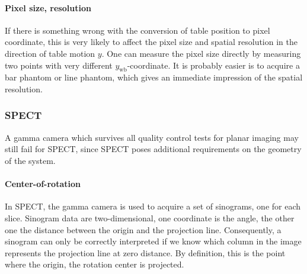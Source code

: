 \documentclass[11pt,oneside]{article}
\begin{document}
\paragraph{Pixel size, resolution}
If there is something wrong with the conversion of table position to pixel
coordinate, this is very likely to affect the pixel size and spatial
resolution in the direction of table motion $y$. One can measure the pixel
size directly by measuring two points with very different
$y_{\mbox{wb}}$-coordinate. It is probably easier is to acquire a bar phantom
or line phantom, which gives an immediate impression of the spatial
resolution.


\subsubsection{SPECT}
A gamma camera which survives all quality control tests for planar
imaging may still fail for SPECT, since SPECT poses additional
requirements on the geometry of the system.

\paragraph{Center-of-rotation}
In SPECT, the gamma camera is used to acquire a set of sinograms, one for each
slice. Sinogram data are two-dimensional, one coordinate is the angle, the
other one the distance between the origin and the projection
line. Consequently, a sinogram can only be correctly interpreted if we know
which column in the image represents the projection line at zero distance. By
definition, this is the point where the origin, the rotation center is
projected.
\end{document}
